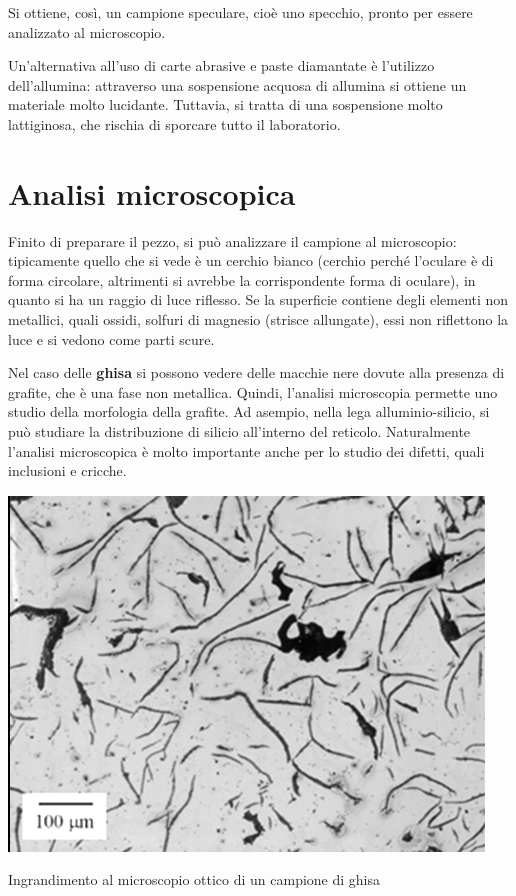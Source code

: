 Si ottiene, così, un campione speculare, cioè uno specchio, pronto per essere analizzato al microscopio.

Un’alternativa all’uso di carte abrasive e paste diamantate è l’utilizzo dell’allumina: attraverso una sospensione acquosa di allumina si ottiene un materiale molto lucidante. Tuttavia, si tratta di una sospensione molto lattiginosa, che rischia di sporcare tutto il laboratorio.

\section{Analisi microscopica}

Finito di preparare il pezzo, si può analizzare il campione al microscopio: tipicamente quello che si vede è un cerchio bianco (cerchio perché l’oculare è di forma circolare, altrimenti si avrebbe la corrispondente forma di oculare), in quanto si ha un raggio di luce riflesso. Se la superficie contiene degli elementi non metallici, quali ossidi, solfuri di magnesio (strisce allungate), essi non riflettono la luce e si vedono come parti scure.

Nel caso delle \textbf{ghisa} si possono vedere delle macchie nere dovute alla presenza di grafite, che è una fase non metallica. Quindi, l’analisi microscopia permette uno studio della morfologia della grafite. Ad asempio, nella lega alluminio-silicio, si può studiare la distribuzione di silicio all’interno del reticolo.
Naturalmente l’analisi microscopica è molto importante anche per lo studio dei difetti, quali inclusioni e cricche.
\begin{marginfigure}[-2.5cm]
\includegraphics{images/img17.png}
\caption{Ingrandimento al microscopio ottico di un campione di ghisa}
\end{marginfigure}

